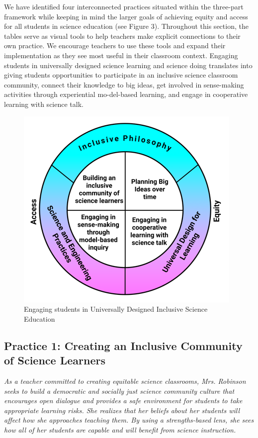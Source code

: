 \documentclass[11.5pt]{sig-alternate}
\begin{document}
\begin{large}
We have identified four interconnected practices situated within the three-part framework while keeping in mind the larger goals of achieving equity and access for all students in science education (see Figure 3). Throughout this section, the tables serve as visual tools to help teachers make explicit connections to their own practice. We encourage teachers to use these tools and expand their implementation as they see most useful in their classroom context. Engaging students in universally designed science learning and science doing translates into giving students opportunities to participate in an inclusive science classroom community, connect their knowledge to big ideas, get involved in sense-making activities through experiential mo-del-based learning, and engage in cooperative learning with science talk. 

\begin{figure}[t]
    \centering
    \includegraphics[width=1\linewidth]{fig3.png}
    \caption{Engaging students in Universally Designed Inclusive Science Education}
\end{figure}

\subsection*{Practice 1: Creating an Inclusive Community of Science Learners}

\textit{As a teacher committed to creating equitable science classrooms, Mrs. Robinson seeks to build a democratic and socially just science community culture that encourages open dialogue and provides a safe environment for students to take appropriate learning risks. She realizes that her beliefs about her students will affect how she approaches teaching them. By using a strengths-based lens, she sees how all of her students are capable and will benefit from science instruction.}


\end{large}
\end{document}
